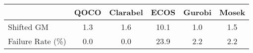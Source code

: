 \begin{tabular}{lccccc}
  \hline
   & \textbf{QOCO} & \textbf{Clarabel} & \textbf{ECOS} & \textbf{Gurobi} & \textbf{Mosek} \\ \hline
  Shifted GM & 1.3 & 1.6 & 10.1 & 1.0 & 1.5 \\ 
  Failure Rate (\%) & 0.0 & 0.0 & 23.9 & 2.2 & 2.2 \\ \hline 
\end{tabular}
